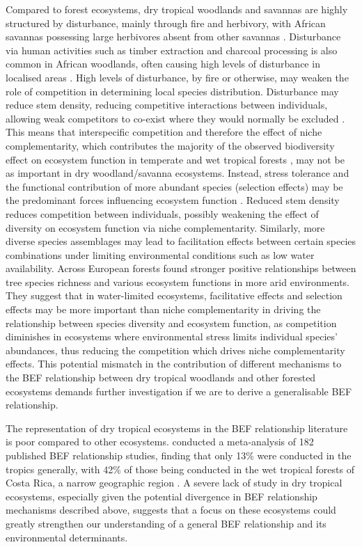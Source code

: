 \documentclass[11pt,a4paper]{article}
\begin{document}
Compared to forest ecosystems, dry tropical woodlands and savannas are highly structured by disturbance, mainly through fire and herbivory, with African savannas possessing large herbivores absent from other savannas \citep{Sankaran2008, Levick2009}. Disturbance via human activities such as timber extraction and charcoal processing is also common in African woodlands, often causing high levels of disturbance in localised areas \citep{Dewees2010}. High levels of disturbance, by fire or otherwise, may weaken the role of competition in determining local species distribution. Disturbance may reduce stem density, reducing competitive interactions between individuals, allowing weak competitors to co-exist where they would normally be excluded \citep{Grime1979, Grace1990}. This means that interspecific competition and therefore the effect of niche complementarity, which contributes the majority of the observed biodiversity effect on ecosystem function in temperate and wet tropical forests \citep{Wright2017, Poorter2015, Sande2017a}, may not be as important in dry woodland/savanna ecosystems. Instead, stress tolerance and the functional contribution of more abundant species (selection effects) may be the predominant forces influencing ecosystem function \citep{Lasky2014, Tobner2016}. Reduced stem density reduces competition between individuals, possibly weakening the effect of diversity on ecosystem function via niche complementarity. Similarly, more diverse species assemblages may lead to facilitation effects between certain species combinations under limiting environmental conditions such as low water availability. Across European forests \citet{Ratcliffe2017} found stronger positive relationships between tree species richness and various ecosystem functions in more arid environments. They suggest that in water-limited ecosystems, facilitative effects and selection effects may be more important than niche complementarity in driving the relationship between species diversity and ecosystem function, as competition diminishes in ecosystems where environmental stress limits individual species' abundances, thus reducing the competition which drives niche complementarity effects. This potential mismatch in the contribution of different mechanisms to the BEF relationship between dry tropical woodlands and other forested ecosystems demands further investigation if we are to derive a generalisable BEF relationship.

The representation of dry tropical ecosystems in the BEF relationship literature is poor compared to other ecosystems. \citet{Clarke2017} conducted a meta-analysis of 182 published BEF relationship studies, finding that only 13\% were conducted in the tropics generally, with 42\% of those being conducted in the wet tropical forests of Costa Rica, a narrow geographic region \citep{Barthlott2005}. A severe lack of study in dry tropical ecosystems, especially given the potential divergence in BEF relationship mechanisms described above, suggests that a focus on these ecosystems could greatly strengthen our understanding of a general BEF relationship and its environmental determinants. 
\end{document}
